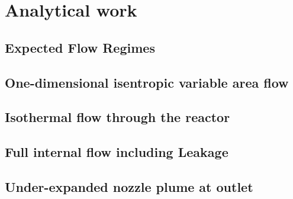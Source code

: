 \section{Analytical work}



\subsection{Expected Flow Regimes}

\newpage

\subsection{One-dimensional isentropic variable area flow}

\newpage

\subsection{Isothermal flow through the reactor}

\newpage

\subsection{Full internal flow including Leakage}

\newpage

\subsection{Under-expanded nozzle plume at outlet}

\newpage
